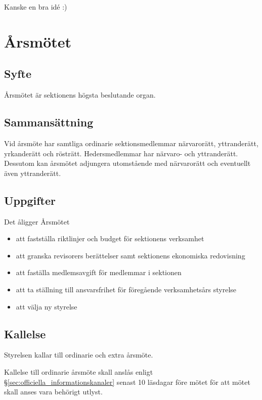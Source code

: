 \documentclass{../resources/dgovdoc}
\begin{document}
Kanske en bra idé :)

\section{Årsmötet}

\subsection{Syfte}

Årsmötet är sektionens högsta beslutande organ.

\subsection{Sammansättning}

Vid årsmöte har samtliga ordinarie sektionsmedlemmar närvarorätt, yttranderätt,
yrkanderätt och rösträtt. Hedersmedlemmar har närvaro- och yttranderätt. Dessutom kan årsmötet
adjungera utomstående med närvarorätt och eventuellt även yttranderätt.

\subsection{Uppgifter}

Det åligger Årsmötet

\begin{itemize}
  \item att fastställa riktlinjer och budget för sektionens verksamhet
  \item att granska revisorers berättelser samt sektionens
    ekonomiska redovisning
  \item att faställa medlemsavgift för medlemmar i sektionen
  \item att ta ställning till ansvarsfrihet för föregående verksamhetsårs styrelse
  \item att välja ny styrelse

\end{itemize}

\subsection{Kallelse}
\label{sec:kallelse}

Styrelsen kallar till ordinarie och extra årsmöte.

Kallelse till ordinarie årsmöte skall anslås enligt
\S\ref{sec:officiella_informationskanaler} senast 10 läsdagar före mötet för att mötet skall anses vara
behörigt utlyst.
\end{document}
